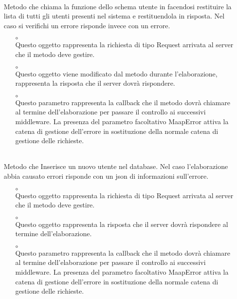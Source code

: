 \begin{itemize}
\item[]  \\ Metodo che chiama la funzione  dello schema utente in  facendosi restituire la lista di tutti gli utenti presenti nel sistema e restituendola in risposta. Nel caso si verifichi un errore risponde invece con un errore.
\begin{itemize}\addtolength{\itemsep}{-0.5\baselineskip}
\item[$\circ$]  \\ Questo oggetto rappresenta la richiesta di tipo Request arrivata al server che il metodo deve gestire.
\item[$\circ$]  \\ Questo oggetto viene modificato dal metodo durante l'elaborazione, rappresenta la risposta che il server dovrà rispondere.
\item[$\circ$]  \\ Questo parametro rappresenta la callback che il metodo dovrà chiamare al termine dell'elaborazione per passare il controllo ai successivi middleware. La presenza del parametro facoltativo MaapError attiva la catena di gestione dell'errore in sostituzione della normale catena di gestione delle richieste.
\end{itemize}
\item[]  \\ Metodo che Inserisce un nuovo utente nel database. Nel caso l'elaborazione abbia causato errori risponde con un json di informazioni sull'errore.
\begin{itemize}\addtolength{\itemsep}{-0.5\baselineskip}
\item[$\circ$]  \\ Questo oggetto rappresenta la richiesta di tipo Request arrivata al server che il metodo deve gestire.
\item[$\circ$]  \\ Questo oggetto rappresenta la risposta che il server dovrà rispondere al termine dell'elaborazione.
\item[$\circ$]  \\ Questo parametro rappresenta la callback che il metodo dovrà chiamare al termine dell'elaborazione per passare il controllo ai successivi middleware. La presenza del parametro facoltativo MaapError attiva la catena di gestione dell'errore in sostituzione della normale catena di gestione delle richieste.

\end{itemize}
\end{itemize}
